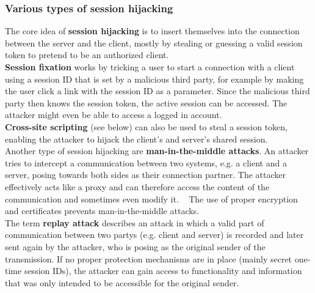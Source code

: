 \documentclass[
	a4paper,
	pagesize,
	pdftex,
	12pt,
	twoside, %
	BCOR=5mm, %
	ngerman,
	fleqn,
	final,
	]{scrartcl}
\begin{document}
\subsubsection{Various types of session hijacking}
The core idea of \textbf{session hijacking} is to insert themselves into the connection between the server and the client, mostly by stealing or guessing a valid session token to pretend to be an authorized client.~\cite{OWASPFoundation.14.8.2014}\\
\textbf{Session fixation} works by tricking a user to start a connection with a client using a session ID that is set by a malicious third party, for example by making the user click a link with the session ID as a parameter. Since the malicious third party then knows the session token, the active session can be accessed. The attacker might even be able to access a logged in account.
~\cite{OWASPFoundation.14.8.2014}\\
\textbf{Cross-site scripting} (see below) can also be used to steal a session token, enabling the attacker to hijack the client's and server's shared session.\\
Another type of session hijacking are \textbf{man-in-the-middle attacks}. An attacker tries to intercept a communication between two systems, e.g. a client and a server, posing towards both sides as their connection partner. The attacker effectively acts like a proxy and can therefore access the content of the communication and sometimes even modify it. ~\cite{OWASPFoundation.31.8.2015} The use of proper encryption and certificates prevents man-in-the-middle attacks.\\
The term \textbf{replay attack} describes an attack in which a valid part of communication between two partys (e.g. client and server) is recorded and later sent again by the attacker, who is posing as the original sender of the transmission. If no proper protection mechanisms are in place (mainly secret one-time session IDs), the attacker can gain access to functionality and information that was only intended to be accessible for the original sender.
\end{document}
